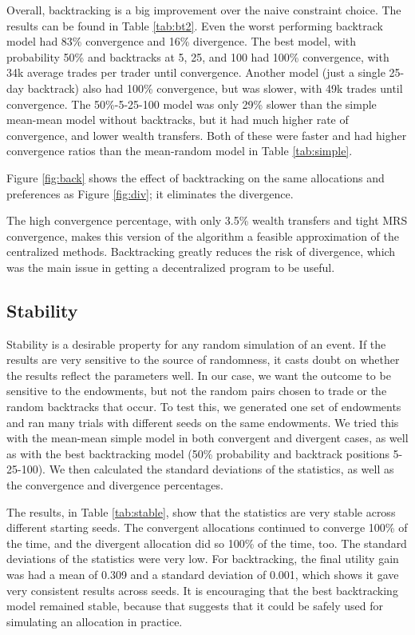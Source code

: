 \documentclass[12pt,a4paper,titlepage]{article}
\newcommand{\co}[1]{\textsf{#1}}
\begin{document}
Overall, backtracking is a big improvement over the naive constraint choice.
The results can be found in Table \ref{tab:bt2}.
Even the worst performing backtrack model had 83\% convergence and 16\% divergence.
The best model, with probability 50\% and backtracks at 5, 25, and 100 had 100\% convergence, with 34k average trades per trader until convergence.
Another model (just a single 25-day backtrack) also had 100\% convergence, but was slower, with 49k trades until convergence.
The 50\%-5-25-100 model was only 29\% slower than the simple \co{mean}-\co{mean} model without backtracks, but it had much higher rate of convergence, and lower wealth transfers.
Both of these were faster and had higher convergence ratios than the \co{mean}-\co{random} model in Table \ref{tab:simple}.


Figure \ref{fig:back} shows the effect of backtracking on the same allocations and preferences as Figure \ref{fig:div}; it eliminates the divergence.

The high convergence percentage, with only 3.5\% wealth transfers and tight MRS convergence, makes this version of the algorithm a feasible approximation of the centralized methods. 
Backtracking greatly reduces the risk of divergence, which was the main issue in getting a decentralized program to be useful.

\subsection{Stability}
Stability is a desirable property for any random simulation of an event.
If the results are very sensitive to the source of randomness, it casts doubt on whether the results reflect the parameters well.
In our case, we want the outcome to be sensitive to the endowments, but not the random pairs chosen to trade or the random backtracks that occur. 
To test this, we generated one set of endowments and ran many trials with different seeds on the same endowments.
We tried this with the \co{mean}-\co{mean} simple model in both convergent and divergent cases, as well as with the best backtracking model (50\% probability and backtrack positions 5-25-100).
We then calculated the standard deviations of the statistics, as well as the convergence and divergence percentages.

The results, in Table \ref{tab:stable}, show that the statistics are very stable across different starting seeds.
The convergent allocations continued to converge 100\% of the time, and the divergent allocation did so 100\% of the time, too.
The standard deviations of the statistics were very low.
For backtracking, the final utility gain was had a mean of 0.309 and a standard deviation of 0.001, which shows it gave very consistent results across seeds.
It is encouraging that the best backtracking model remained stable, because that suggests that it could be safely used for simulating an allocation in practice.
\end{document}
